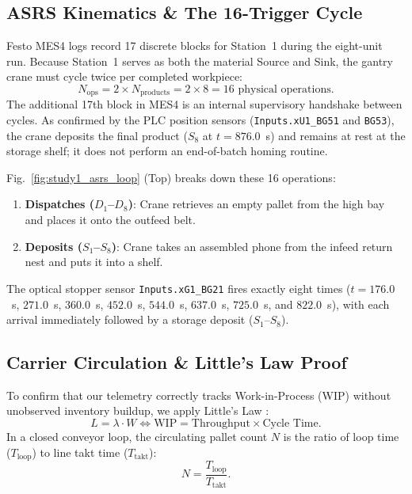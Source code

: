 \documentclass[journal]{IEEEtran}
\begin{document}
\subsection{ASRS Kinematics \& The 16-Trigger Cycle}
Festo MES4 logs record 17 discrete blocks for Station~1 during the eight-unit run. Because Station~1 serves as both the material Source and Sink, the gantry crane must cycle twice per completed workpiece:
\begin{equation}
N_{\text{ops}} = 2 \times N_{\text{products}} = 2 \times 8 = 16\text{ physical operations}.
\label{eq:n_ops}
\end{equation}
The additional 17th block in MES4 is an internal supervisory handshake between cycles. As confirmed by the PLC position sensors (\texttt{Inputs.xU1\_BG51} and \texttt{BG53}), the crane deposits the final product ($S_8$ at $t = 876.0$~s) and remains at rest at the storage shelf; it does not perform an end-of-batch homing routine.

Fig.~\ref{fig:study1_asrs_loop} (Top) breaks down these 16 operations:
\begin{enumerate}
    \item \textbf{Dispatches ($D_1$--$D_8$)}: Crane retrieves an empty pallet from the high bay and places it onto the outfeed belt.
    \item \textbf{Deposits ($S_1$--$S_8$)}: Crane takes an assembled phone from the infeed return nest and puts it into a shelf.
\end{enumerate}
The optical stopper sensor \texttt{Inputs.xG1\_BG21} fires exactly eight times ($t = 176.0$~s, $271.0$~s, $360.0$~s, $452.0$~s, $544.0$~s, $637.0$~s, $725.0$~s, and $822.0$~s), with each arrival immediately followed by a storage deposit ($S_1$--$S_8$).

\subsection{Carrier Circulation \& Little's Law Proof}
To confirm that our telemetry correctly tracks Work-in-Process (WIP) without unobserved inventory buildup, we apply Little's Law \cite{ref_little_law}:
\begin{equation}
L = \lambda \cdot W \iff \text{WIP} = \text{Throughput} \times \text{Cycle Time}.
\label{eq:littles_law}
\end{equation}
In a closed conveyor loop, the circulating pallet count $N$ is the ratio of loop time ($T_{\text{loop}}$) to line takt time ($T_{\text{takt}}$):
\begin{equation}
N = \frac{T_{\text{loop}}}{T_{\text{takt}}}.
\label{eq:n_carriers}
\end{equation}
\end{document}
